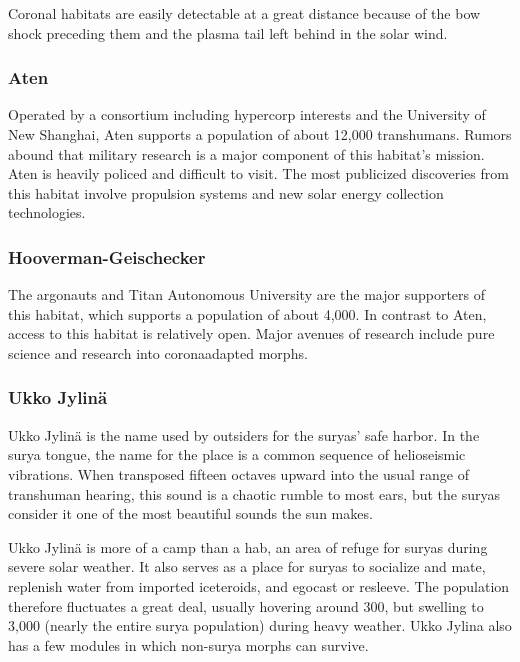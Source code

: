 Coronal habitats are easily detectable at a great distance because of the bow shock preceding them and the plasma tail left behind in the solar wind. 

\subsubsection{Aten} \label{sec:aten} 

Operated by a consortium including hypercorp interests and the University of New Shanghai, Aten supports a population of about 12,000 transhumans. Rumors abound that military research is a major component of this habitat's mission. Aten is heavily policed and difficult to visit. The most publicized discoveries from this habitat involve propulsion systems and new solar energy collection technologies. 

\subsubsection{Hooverman-Geischecker} \label{sec:hoov-geisch} 

The argonauts and Titan Autonomous University are the major supporters of this habitat, which supports a population of about 4,000. In contrast to Aten, access to this habitat is relatively open. Major avenues of research include pure science and research into coronaadapted morphs. 

\subsubsection{Ukko Jylinä} \label{sec:ukko-jylina} 

Ukko Jylinä is the name used by outsiders for the suryas' safe harbor. In the surya tongue, the name for the place is a common sequence of helioseismic vibrations. When transposed fifteen octaves upward into the usual range of transhuman hearing, this sound is a chaotic rumble to most ears, but the suryas consider it one of the most beautiful sounds the sun makes. 

Ukko Jylinä is more of a camp than a hab, an area of refuge for suryas during severe solar weather. It also serves as a place for suryas to socialize and mate, replenish water from imported iceteroids, and egocast or resleeve. The population therefore fluctuates a great deal, usually hovering around 300, but swelling to 3,000 (nearly the entire surya population) during heavy weather. Ukko Jylina also has a few modules in which non-surya morphs can survive. 

